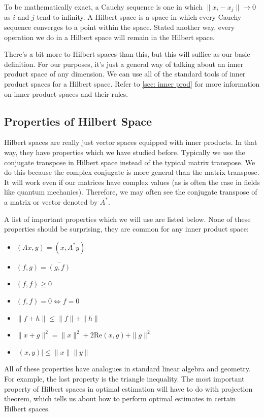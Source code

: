 To be mathematically exact, a Cauchy sequence is one in which $\|x_i-x_j\|\rightarrow0$ as $i$ and $j$ tend to infinity. A Hilbert space is a space in which every Cauchy sequence converges to a point within the space. Stated another way, every operation we do in a Hilbert space will remain in the Hilbert space.

There's a bit more to Hilbert spaces than this, but this will suffice as our basic definition. For our purposes, it's just a general way of talking about an inner product space of any dimension. We can use all of the standard tools of inner product spaces for a Hilbert space. Refer to \autoref{sec: inner prod} for more information on inner product spaces and their rules.

\subsection{Properties of Hilbert Space}
Hilbert spaces are really just vector spaces equipped with inner products. In that way, they have properties which we have studied before. Typically we use the conjugate transpose in Hilbert space instead of the typical matrix transpose. We do this because the complex conjugate is more general than the matrix transpose. It will work even if our matrices have complex values (as is often the case in fields like quantum mechanics). Therefore, we may often see the conjugate transpose of a matrix or vector denoted by $A^*$.

A list of important properties which we will use are listed below. None of these properties should be surprising, they are common for any inner product space:
\begin{itemize}
    \item $(Ax,y)=(x,A^*y)$
    \item $(f,g)=\overline{(g,f)}$
    \item $(f,f)\ge0$
    \item $(f,f)=0\Leftrightarrow f=0$
    \item $\|f+h\|\le\|f\|+\|h\|$
    \item $\|x+g\|^2=\|x\|^2+2\mathrm{Re}(x,g)+\|g\|^2$
    \item $|(x,y)|\le\|x\|\|y\|$
\end{itemize}

All of these properties have analogues in standard linear algebra and geometry. For example, the last property is the triangle inequality. The most important property of Hilbert spaces in optimal estimation will have to do with projection theorem, which tells us about how to perform optimal estimates in certain Hilbert spaces.

